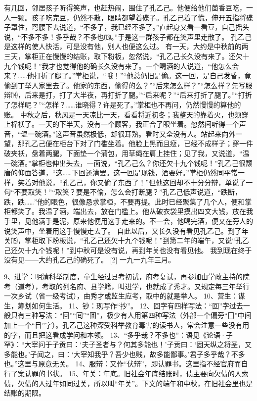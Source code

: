 \documentclass[12pt,UTF8]{ctexbook}
\begin{document}
有几回，邻居孩子听得笑声，也赶热闹，围住了孔乙己。他便给他们茴香豆吃，一人一颗。孩子吃完豆，仍然不散，眼睛都望着碟子。孔乙己着了慌，伸开五指将碟子罩住，弯腰下去说道，“不多了，我已经不多了。”直起身又看一看豆，自己摇头说，“不多不多！多乎哉？不多也⒀。”于是这一群孩子都在笑声里走散了。
孔乙己是这样的使人快活，可是没有他，别人也便这么过。
有一天，大约是中秋前的两三天，掌柜正在慢慢的结账，取下粉板，忽然说，“孔乙己长久没有来了。还欠十九个钱呢！”我才也觉得他的确长久没有来了。一个喝酒的人说道，“他怎么会来？……他打折了腿了。”掌柜说，“哦！”“他总仍旧是偷。这一回，是自己发昏，竟偷到丁举人家里去了。他家的东西，偷得的么？”“后来怎么样？”“怎么样？先写服辩⒁，后来是打，打了大半夜，再打折了腿。”“后来呢？”“后来打折了腿了。”“打折了怎样呢？”“怎样？……谁晓得？许是死了。”掌柜也不再问，仍然慢慢的算他的账。
中秋之后，秋风是一天凉比一天，看看将近初冬；我整天的靠着火，也须穿上棉袄了。一天的下半天，没有一个顾客，我正合了眼坐着。忽然间听得一个声音，“温一碗酒。”这声音虽然极低，却很耳熟。看时又全没有人。站起来向外一望，那孔乙己便在柜台下对了门槛坐着。他脸上黑而且瘦，已经不成样子；穿一件破夹袄，盘着两腿，下面垫一个蒲包，用草绳在肩上挂住；见了我，又说道，“温一碗酒。”掌柜也伸出头去，一面说，“孔乙己么？你还欠十九个钱呢！”孔乙己很颓唐的仰面答道，“这……下回还清罢。这一回是现钱，酒要好。”掌柜仍然同平常一样，笑着对他说，“孔乙己，你又偷了东西了！”但他这回却不十分分辩，单说了一句“不要取笑！”“取笑？要是不偷，怎么会打断腿？”孔乙己低声说道，“跌断，跌，跌……”他的眼色，很像恳求掌柜，不要再提。此时已经聚集了几个人，便和掌柜都笑了。我温了酒，端出去，放在门槛上。他从破衣袋里摸出四文大钱，放在我手里，见他满手是泥，原来他便用这手走来的。不一会，他喝完酒，便又在旁人的说笑声中，坐着用这手慢慢走去了。
自此以后，又长久没有看见孔乙己。到了年关⒂，掌柜取下粉板说，“孔乙己还欠十九个钱呢！”到第二年的端午，又说“孔乙己还欠十九个钱呢！”到中秋可是没有说，再到年关也没有看见他。
我到现在终于没有见——大约孔乙己的确死了。 [2]
一九一九年三月。


9、进学：明清科举制度，童生经过县考初试，府考复试，再参加由学政主持的院考（道考），考取的列名府、县学籍，叫进学，也就成了秀才。又规定每三年举行一次乡试（省一级考试），由秀才或监生应考，取中的就是举人。
10、营生：谋生，筹划如何生活。
11、钞：现写作“抄”。
12、回字有四样写法：“回”字过去一般只有三种写法：“回”“囘”“囬”，极少有人用第四种写法（外部一个偏旁“囗”中间加上一个“目”字）。孔乙己这种深受科举教育毒害的读书人，常会注意一些没有用的字，而且把这看成学问和本领。
13、“多乎哉？不多也”：语见《论语·子罕》：“大宰问于子贡曰：‘夫子圣者与？何其多能也！’子贡曰：‘固天纵之将圣，又多能也。’子闻之，曰：‘大宰知我乎？吾少也贱，故多能鄙事。’君子多乎哉？不多也。”这里与原意无关。
14、服辩：又作“伏辩”，即认罪书。这里指不经官府而自行了案认罪的书状。
15、年关：年底。旧社会年底结账时，债主要向欠债的人索债，欠债的人过年如同过关，所以叫“年关”。下文的端午和中秋，在旧社会里也是结账的期限。

\backmatter
\end{document}
